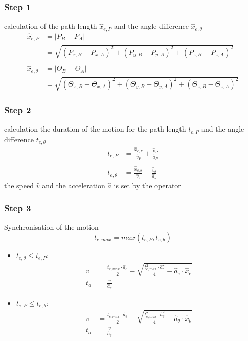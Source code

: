 \documentclass[%
  professionalfonts,%
  xcolor={%
    usenames,%
    dvipsnames,%
    svgnames,%
    table,%
    hyperref%
  }%
]{beamer}
\begin{document}
\subsubsection{Step 1}
\begin{frame}
calculation of the path length $\hat{x}_{e,P}$ and the angle difference $\hat{x}_{e,\theta}$
\begin{align*}
\hat{x}_{e,P} & = \left|P_{B} - P_{A}\right|\\
& = \sqrt{(P_{x,B} - P_{x,A})^2 + (P_{y,B} - P_{y,A})^2 + (P_{z,B} - P_{z,A})^2 }\\
\\
\hat{x}_{e,\theta} & = \left|\Theta_{B} - \Theta_{A}\right|\\
& = \sqrt{(\Theta_{x,B} - \Theta_{x,A})^2 + (\Theta_{y,B} - \Theta_{y,A})^2 + (\Theta_{z,B} - \Theta_{z,A})^2 }
\end{align*}
\end{frame}

\subsubsection{Step 2}
\begin{frame}
calculation the duration of the motion for the path length $t_{e,P}$ and the angle difference $t_{e,\theta}$
\begin{align*}
t_{e,P} & = \frac{\hat{x}_{e,P}}{\hat{v}_{P}}+\frac{\hat{v}_{P}}{\hat{a}_{P}} \\
\\
t_{e,\theta} & = \frac{\hat{x}_{e,\theta}}{\hat{v}_{\theta}}+\frac{\hat{v}_{\theta}}{\hat{a}_{\theta}}
\end{align*}
the speed $\hat{v}$ and the acceleration $\hat{a}$ is set by the operator
\end{frame}

\subsubsection{Step 3}
\begin{frame}
Synchronisation of the motion
\begin{equation}
t_{e, max} = max\left(t_{e,P}, t_{e,\theta}\right)
\end{equation}
\begin{itemize}
\item $t_{e,\theta} \le t_{e,P}$:
\begin{align*}
v & = \frac{t_{e,max} \cdot \hat{a}_{e}}{2}-\sqrt{\frac{t_{e,max}^2 \cdot \hat{a}_{e}^2}{4}-\hat{a}_{e}\cdot \hat{x}_{e}} \\
t_{a} & = \frac{v}{\hat{a}_{e}}
\end{align*}
\item $t_{e,P} \leq t_{e,\theta}$:
\begin{align*}
v & = \frac{t_{e,max} \cdot \hat{a}_{\theta}}{2}-\sqrt{\frac{t_{e,max}^2 \cdot \hat{a}_{\theta}^2}{4}-\hat{a}_{\theta}\cdot \hat{x}_{\theta}} \\
t_{a} & = \frac{v }{\hat{a}_{\theta}}
\end{align*}
\end{itemize}
\end{frame}
\end{document}
